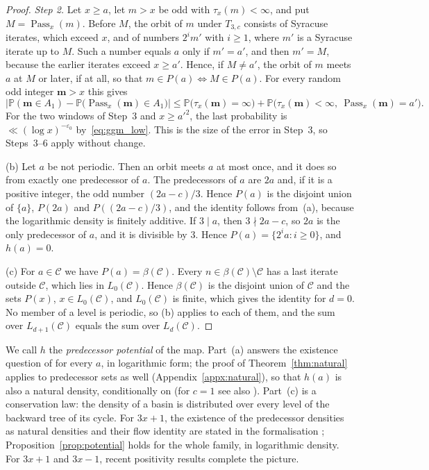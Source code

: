 \documentclass[12pt]{amsart}
\theoremstyle{definition}
\theoremstyle{remark}
\begin{document}
\begin{proof}
\emph{Step 2.} Let $x\ge a$, let $m>x$ be odd with $\tau_x(m)<\infty$, and put $M=\operatorname{Pass}_x(m)$. Before $M$, the orbit of $m$ under $T_{3,c}$ consists of Syracuse iterates, which exceed $x$, and of numbers $2^im'$ with $i\ge1$, where $m'$ is a Syracuse iterate up to $M$. Such a number equals $a$ only if $m'=a'$, and then $m'=M$, because the earlier iterates exceed $x\ge a'$. Hence, if $M\ne a'$, the orbit of $m$ meets $a$ at $M$ or later, if at all, so that $m\in P(a)\iff M\in P(a)$. For every random odd integer $\mathbf m>x$ this gives
\[
\bigl|\mathbb P(\mathbf m\in A_1)-\mathbb P\bigl(\operatorname{Pass}_x(\mathbf m)\in A_1\bigr)\bigr|\le\mathbb P\bigl(\tau_x(\mathbf m)=\infty\bigr)+\mathbb P\bigl(\tau_x(\mathbf m)<\infty,\ \operatorname{Pass}_x(\mathbf m)=a'\bigr).
\]
For the two windows of Step~3 and $x\ge a'^2$, the last probability is $\ll(\log x)^{-\varepsilon_0}$ by~\eqref{eq:ggm_low}. This is the size of the error in Step~3, so Steps~3--6 apply without change.

(b) Let $a$ be not periodic. Then an orbit meets $a$ at most once, and it does so from exactly one predecessor of $a$. The predecessors of $a$ are $2a$ and, if it is a positive integer, the odd number $(2a-c)/3$. Hence $P(a)$ is the disjoint union of $\{a\}$, $P(2a)$ and $P((2a-c)/3)$, and the identity follows from~(a), because the logarithmic density is finitely additive. If $3\mid a$, then $3\nmid2a-c$, so $2a$ is the only predecessor of $a$, and it is divisible by $3$. Hence $P(a)=\{2^ia:i\ge0\}$, and $h(a)=0$.

(c) For $a\in\mathcal C$ we have $P(a)=\beta(\mathcal C)$. Every $n\in\beta(\mathcal C)\setminus\mathcal C$ has a last iterate outside $\mathcal C$, which lies in $L_0(\mathcal C)$. Hence $\beta(\mathcal C)$ is the disjoint union of $\mathcal C$ and the sets $P(x)$, $x\in L_0(\mathcal C)$, and $L_0(\mathcal C)$ is finite, which gives the identity for $d=0$. No member of a level is periodic, so (b) applies to each of them, and the sum over $L_{d+1}(\mathcal C)$ equals the sum over $L_d(\mathcal C)$.
\end{proof}

We call $h$ the \emph{predecessor potential} of the map. Part~(a) answers the existence question of \cite[Remark~1.7]{GGM_2025} for every $a$, in logarithmic form; the proof of Theorem~\ref{thm:natural} applies to predecessor sets as well (Appendix~\ref{appx:natural}), so that $h(a)$ is also a natural density, conditionally on \cite{Allikvere_2026} (for $c=1$ see also \cite{CLT_2026}). Part~(c) is a conservation law: the density of a basin is distributed over every level of the backward tree of its cycle. For $3x+1$, the existence of the predecessor densities as natural densities and their flow identity are stated in the formalisation \cite{CLT_2026}; Proposition~\ref{prop:potential} holds for the whole family, in logarithmic density. For $3x+1$ and $3x-1$, recent positivity results complete the picture.
\end{document}

